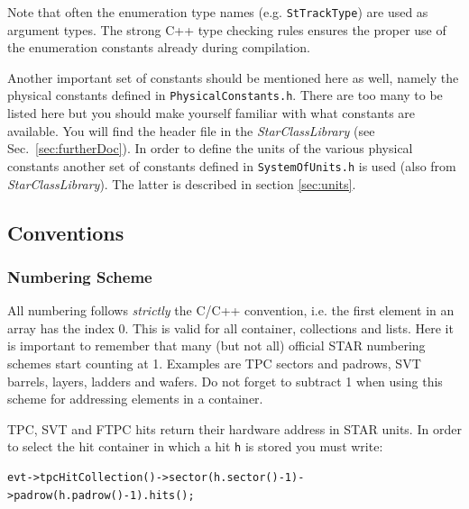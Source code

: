 \documentclass[twoside]{article}
\newcommand{\name}[1]{\textsl{#1}}%
\begin{document}
Note that often the enumeration type names (e.g. \texttt{StTrackType})
are used as argument types. The strong C++ type checking rules ensures
the proper use of the enumeration constants already during
compilation.

Another important set of constants should be mentioned here as well,
namely the physical constants defined in \texttt{PhysicalConstants.h}.
There are too many to be listed here but you should make yourself
familiar with what constants are available. You will find the header
file in the \name{StarClassLibrary} (see Sec.~\ref{sec:furtherDoc}).
 In order to define the units of the various
physical constants another set of constants defined in
\texttt{SystemOfUnits.h} is used (also from \name{StarClassLibrary}).
The latter is described in section \ref{sec:units}.

\subsection{Conventions}
\label{sec:conventions}

\subsubsection{Numbering Scheme}
\label{sec:conventionsNumbering}

All numbering follows \emph{strictly} the C/C++ convention, i.e. the
first element in an array has the index 0. This is valid for all
container, collections and lists. Here it is important to remember
that many (but not all) official STAR numbering schemes start counting
at 1.  Examples are TPC sectors and padrows, SVT barrels, layers, ladders and
wafers. Do not forget to subtract 1 when using this scheme for
addressing elements in a container.

TPC, SVT and FTPC hits return their hardware address in STAR units.
In order to select the hit container in which a hit \texttt{h} is
stored you must write:
\begin{verbatim}
evt->tpcHitCollection()->sector(h.sector()-1)->padrow(h.padrow()-1).hits();
\end{verbatim}
\end{document}
